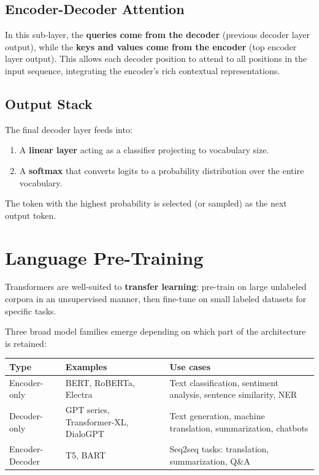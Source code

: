 \documentclass[11pt,a4paper]{article}
\theoremstyle{definition}
\theoremstyle{plain}
\theoremstyle{remark}
\begin{document}
\subsection{Encoder-Decoder Attention}

In this sub-layer, the \textbf{queries come from the decoder} (previous decoder layer output), while the \textbf{keys and values come from the encoder} (top encoder layer output). This allows each decoder position to attend to all positions in the input sequence, integrating the encoder's rich contextual representations.

\subsection{Output Stack}

The final decoder layer feeds into:
\begin{enumerate}
    \item A \textbf{linear layer} acting as a classifier projecting to vocabulary size.
    \item A \textbf{softmax} that converts logits to a probability distribution over the entire vocabulary.
\end{enumerate}
The token with the highest probability is selected (or sampled) as the next output token.


\section{Language Pre-Training}

Transformers are well-suited to \textbf{transfer learning}: pre-train on large unlabeled corpora in an unsupervised manner, then fine-tune on small labeled datasets for specific tasks.

Three broad model families emerge depending on which part of the architecture is retained:

\begin{center}
\renewcommand{\arraystretch}{1.4}
\begin{tabular}{llp{5.5cm}}
    \hline
    \textbf{Type} & \textbf{Examples} & \textbf{Use cases} \\
    \hline
    Encoder-only  & BERT, RoBERTa, Electra & Text classification, sentiment analysis, sentence similarity, NER \\
    Decoder-only  & GPT series, Transformer-XL, DialoGPT & Text generation, machine translation, summarization, chatbots \\
    Encoder-Decoder & T5, BART & Seq2seq tasks: translation, summarization, Q\&A \\
    \hline
\end{tabular}
\end{center}
\end{document}

